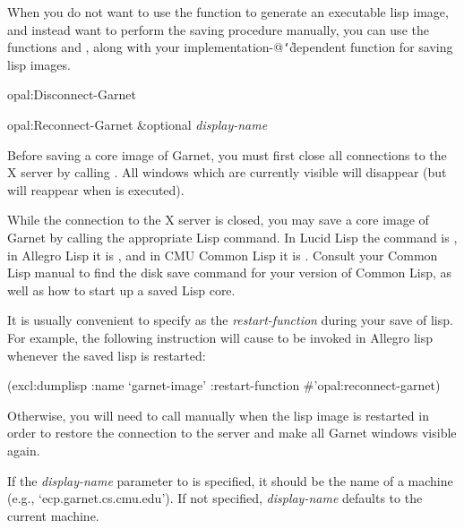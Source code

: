 When you do not want to use the function  to generate
an executable lisp image, and instead want to perform the saving procedure
manually, you can use the functions  and
, along with your implementation-@{\tt\char`\|}dependent
function for saving lisp images.

\vspace{.5 line}
\begin{programexample}
opal:Disconnect-Garnet\value{function}

opal:Reconnect-Garnet \&optional {\it display-name} \value{function}
\end{programexample}

Before saving a core image of Garnet, you must first close all connections
to the X server by calling .  All windows which are
currently visible will disappear (but will reappear when
 is executed).

While the connection to the X server is closed, you
may save a core image of Garnet by calling the appropriate Lisp
command.  In Lucid Lisp the command is , in
Allegro Lisp it is , and in CMU Common Lisp
it is .  Consult your Common Lisp manual to
find the disk save command for your version of Common Lisp, as
well as how to start up a saved Lisp core.

It is usually convenient to specify  as the
{\it restart-function} during your save of lisp.  For example, the following
instruction will cause  to be invoked in
Allegro lisp whenever the saved lisp is restarted:

\begin{programexample}
(excl:dumplisp :name `garnet-image' :restart-function \#'opal:reconnect-garnet)
\end{programexample}

Otherwise, you will need to call  manually when
the lisp image is restarted in order to restore the connection to the server
and make all Garnet windows visible again.

If the {\it display-name} parameter to  is specified,
it should be the name of a machine (e.g., `ecp.garnet.cs.cmu.edu').
If not specified, {\it display-name} defaults to the current machine.



